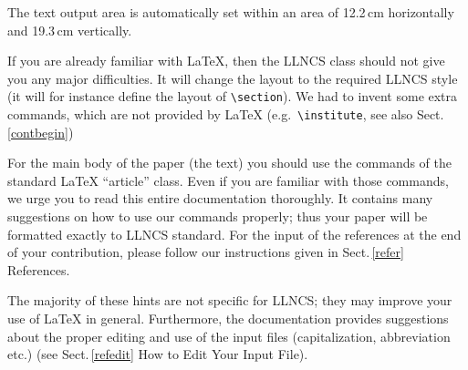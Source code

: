 \documentclass{llncs}
\begin{document}
The text output area is automatically set within an area of
12.2\,cm horizontally  and 19.3\,cm vertically.

If you are already familiar with \LaTeX{}, then the
LLNCS class should not give you any major difficulties.
It will change the layout to the required LLNCS style
(it will for instance define the layout of \verb|\section|).
We had to invent some extra commands,
which are not provided by \LaTeX{} (e.g.\
\verb|\institute|, see also Sect.\,\ref{contbegin})

For the main body of the paper (the text) you
should use the commands of the standard \LaTeX{} ``article'' class.
Even if you are familiar with those commands, we urge you to read
this entire documentation thoroughly. It contains many suggestions on
how to use our commands properly; thus your paper
will be formatted exactly to LLNCS standard.
For the input of the references at the end of your contribution,
please follow our instructions given in Sect.\,\ref{refer} References.

The majority of these hints are not specific for LLNCS; they may improve
your use of \LaTeX{} in general.
Furthermore, the documentation provides suggestions about the proper
editing and use
of the input files (capitalization, abbreviation etc.) (see
Sect.\,\ref{refedit} How to Edit Your Input File).
%
\end{document}
